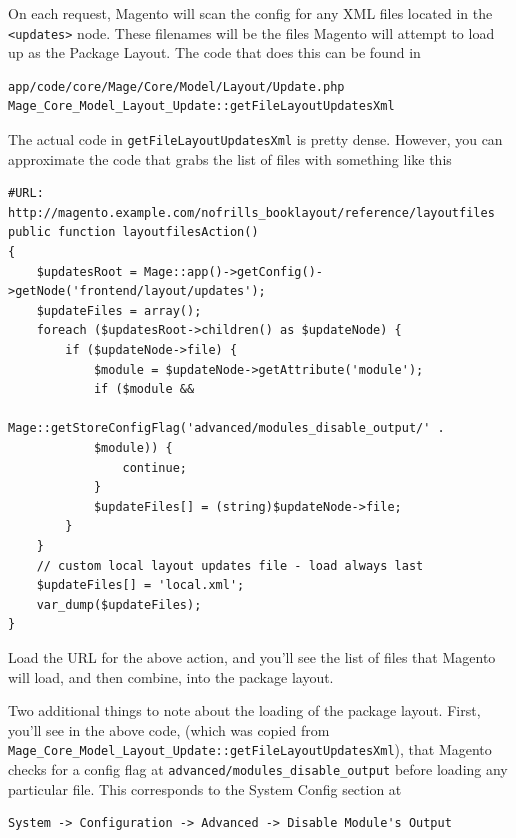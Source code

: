 \documentclass[oneside]{book}
\begin{document}
On each request, Magento will scan the config for any XML files located in the  \footnotesize\texttt{\textless updates\textgreater } \normalsize  node.  These filenames will be the files Magento will attempt to load up as the Package Layout.  The code that does this can be found in 

\begin{lstlisting}
app/code/core/Mage/Core/Model/Layout/Update.php
Mage_Core_Model_Layout_Update::getFileLayoutUpdatesXml

\end{lstlisting}


The actual code in \footnotesize\texttt{getFileLayoutUpdatesXml} \normalsize  is pretty dense. However, you can approximate the code that grabs the list of files with something like this

\begin{lstlisting}
#URL: http://magento.example.com/nofrills_booklayout/reference/layoutfiles
public function layoutfilesAction()
{
    $updatesRoot = Mage::app()->getConfig()->getNode('frontend/layout/updates');
    $updateFiles = array();
    foreach ($updatesRoot->children() as $updateNode) {
        if ($updateNode->file) {
            $module = $updateNode->getAttribute('module');
            if ($module && 
            Mage::getStoreConfigFlag('advanced/modules_disable_output/' .
            $module)) {
                continue;
            }
            $updateFiles[] = (string)$updateNode->file;
        }
    }
    // custom local layout updates file - load always last
    $updateFiles[] = 'local.xml';       
    var_dump($updateFiles);
}

\end{lstlisting}


Load the URL for the above action, and you'll see the list of files that Magento will load, and then combine, into the package layout. 

Two additional things to note about the loading of the package layout.  First, you'll see in the above code, (which was copied from \footnotesize\texttt{Mage\_Core\_Model\_Layout\_Update::getFileLayoutUpdatesXml}\normalsize), that Magento checks for a config flag at \footnotesize\texttt{advanced/modules\_disable\_output} \normalsize  before loading any particular file.  This corresponds to the System Config section at 

\begin{lstlisting}
System -> Configuration -> Advanced -> Disable Module's Output

\end{lstlisting}
\end{document}
